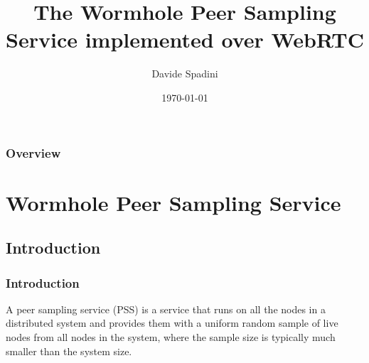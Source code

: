 \documentclass{beamer}
\title[WPSS implemented over WebRTC]{The Wormhole Peer Sampling Service implemented over WebRTC} %
\author{Davide Spadini} %
\institute[Unitn] %
{
University of Trento \\ %
\medskip
\textit{davide.spadini@unitn.it} %
}
\date{\today} %
\begin{document}
\begin{frame}
\titlepage %
\end{frame}

\begin{frame}
\frametitle{Overview} %
\tableofcontents %
\end{frame}


\section{Wormhole Peer Sampling Service} %

\subsection{Introduction} %

\begin{frame}
\frametitle{Introduction}
A peer sampling service (PSS) is a service that runs on all the nodes in a distributed system and provides them with a uniform random sample of live nodes from all nodes in the system, where the sample size is typically much smaller than the system size. 
\end{frame}

\end{document}
